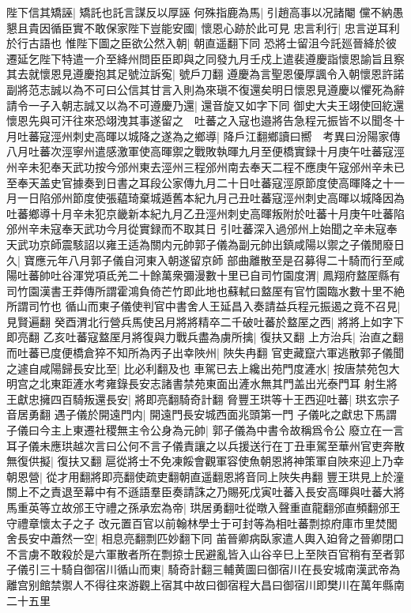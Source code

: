陛下信其矯誣|{
	矯託也託言謀反以厚誣}
何殊指鹿為馬|{
	引趙高事以况諸閹}
儻不納愚懇且貴因循臣實不敢保家陛下豈能安國|{
	懷恩心跡於此可見}
忠言利行|{
	忠言逆耳利於行古語也}
惟陛下圖之臣欲公然入朝|{
	朝直遥翻下同}
恐將士留沮今託廵晉絳於彼遷延乞陛下特遣一介至絳州問臣臣即與之同發九月壬戍上遣裴遵慶詣懷恩諭旨且察其去就懷恩見遵慶抱其足號泣訴寃|{
	號戶刀翻}
遵慶為言聖恩優厚諷令入朝懷恩許諾副將范志誠以為不可曰公信其甘言入則為來瑱不復還矣明日懷恩見遵慶以懼死為辭請令一子入朝志誠又以為不可遵慶乃還|{
	還音旋又如字下同}
御史大夫王翊使回紇還懷恩先與可汗往來恐翊洩其事遂留之　吐蕃之入寇也邉將告急程元振皆不以聞冬十月吐蕃寇涇州刺史高暉以城降之遂為之鄉導|{
	降戶江翻鄉讀曰嚮　考異曰汾陽家傳八月吐蕃次涇寧州遣感激軍使高暉禦之戰敗執暉九月至便橋實録十月庚午吐蕃寇涇州辛未犯奉天武功按今邠州東去涇州三程邠州南去奉天二程不應庚午寇邠州辛未已至奉天盖史官據奏到日書之耳段公家傳九月二十日吐蕃寇涇原節度使高暉降之十一月一日陷邠州節度使張藴琦棄城遁舊本紀九月己丑吐蕃寇涇州刺史高暉以城降因為吐蕃鄉導十月辛未犯京畿新本紀九月乙丑涇州刺史高暉叛附於吐蕃十月庚午吐蕃陷邠州辛未寇奉天武功今月從實録而不取其日}
引吐蕃深入過邠州上始聞之辛未寇奉天武功京師震駭詔以雍王适為關内元帥郭子儀為副元帥出鎮咸陽以禦之子儀閒廢日久|{
	寶應元年八月郭子儀自河東入朝遂留京師}
部曲離散至是召募得二十騎而行至咸陽吐蕃帥吐谷渾党項氐羌二十餘萬衆彌漫數十里已自司竹園度渭|{
	鳳翔府盩厔縣有司竹園漢書王莽傳所謂霍鴻負倚芒竹即此地也蘇軾曰盩厔有官竹園臨水數十里不絶所謂司竹也}
循山而東子儀使判官中書舍人王延昌入奏請益兵程元振遏之竟不召見|{
	見賢遍翻}
癸酉渭北行營兵馬使呂月將將精卒二千破吐蕃於盩厔之西|{
	將將上如字下即亮翻}
乙亥吐蕃寇盩厔月將復與力戰兵盡為虜所擒|{
	復扶又翻}
上方治兵|{
	治直之翻}
而吐蕃已度便橋倉猝不知所為丙子出幸陜州|{
	陜失冉翻}
官吏藏竄六軍逃散郭子儀聞之遽自咸陽歸長安比至|{
	比必利翻及也}
車駕已去上纔出苑門度滻水|{
	按唐禁苑包大明宫之北東距滻水考雍錄長安志諸書禁苑東面出滻水無其門盖出光泰門耳}
射生將王獻忠擁四百騎叛還長安|{
	將即亮翻騎奇計翻}
脅豐王珙等十王西迎吐蕃|{
	珙玄宗子音居勇翻}
遇子儀於開遠門内|{
	開遠門長安城西面兆頭第一門}
子儀叱之獻忠下馬謂子儀曰今主上東遷社稷無主令公身為元帥|{
	郭子儀為中書令故稱爲令公}
廢立在一言耳子儀未應珙越次言曰公何不言子儀責讓之以兵援送行在丁丑車駕至華州官吏奔散無復供擬|{
	復扶又翻}
扈從將士不免凍餒會觀軍容使魚朝恩將神策軍自陜來迎上乃幸朝恩營|{
	從才用翻將即亮翻使疏吏翻朝直遥翻恩將音同上陜失冉翻}
豐王珙見上於潼關上不之責退至幕中有不遜語羣臣奏請誅之乃賜死戊寅吐蕃入長安高暉與吐蕃大將馬重英等立故邠王守禮之孫承宏為帝|{
	珙居勇翻吐從暾入聲重直龍翻邠直頻翻邠王守禮章懷太子之子}
改元置百官以前翰林學士于可封等為相吐蕃剽掠府庫市里焚閭舍長安中蕭然一空|{
	相息亮翻剽匹妙翻下同}
苖晉卿病臥家遣人輿入廹脅之晉卿閉口不言虜不敢殺於是六軍散者所在剽掠士民避亂皆入山谷辛巳上至陜百官稍有至者郭子儀引三十騎自御宿川循山而東|{
	騎奇計翻三輔黄圖曰御宿川在長安城南漢武帝為離宫别館禁禦人不得往來游觀上宿其中故曰御宿程大昌曰御宿川即樊川在萬年縣南二十五里}
